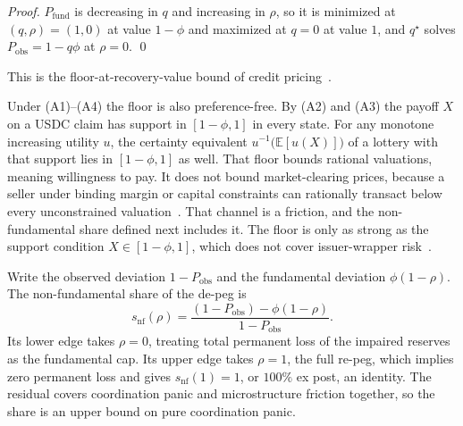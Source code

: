 \begin{proof}
$P_{\mathrm{fund}}$ is decreasing in $q$ and increasing in $\rho$, so it is minimized at
$(q,\rho)=(1,0)$ at value $1-\phi$ and maximized at $q=0$ at value $1$, and $q^{\star}$
solves $P_{\mathrm{obs}}=1-q\phi$ at $\rho=0$. \qed
\end{proof}

This is the floor-at-recovery-value bound of credit
pricing~\cite{merton1974,duffiesingleton1999}.

Under (A1)--(A4) the floor is also preference-free. By (A2) and (A3) the payoff $X$ on a
USDC claim has support in $[1-\phi,1]$ in every state. For any monotone increasing utility
$u$, the certainty equivalent $u^{-1}\!\bigl(\mathbb{E}[u(X)]\bigr)$ of a lottery with
that support lies in $[1-\phi,1]$ as well. That floor bounds rational
valuations, meaning willingness to pay. It does not bound market-clearing
prices, because a seller under binding margin or capital constraints can rationally
transact below every unconstrained valuation~\cite{shleifervishny1997,grombvayanos2010}.
That channel is a friction, and the non-fundamental share defined next includes it. The
floor is only as strong as the support condition $X\in[1-\phi,1]$, which does not cover
issuer-wrapper risk~\cite{Gorton_2021}.

Write the observed deviation $1-P_{\mathrm{obs}}$ and the fundamental deviation
$\phi(1-\rho)$. The non-fundamental share of the de-peg is
\begin{equation}
s_{\mathrm{nf}}(\rho)
  = \frac{(1-P_{\mathrm{obs}})-\phi(1-\rho)}{1-P_{\mathrm{obs}}} .
\label{eq:share}
\end{equation}
Its lower edge takes $\rho=0$, treating total permanent loss of the impaired reserves as
the fundamental cap. Its upper edge takes $\rho=1$, the full re-peg, which
implies zero permanent loss and gives $s_{\mathrm{nf}}(1)=1$, or $100\%$ ex post, an
identity. The residual covers coordination panic and microstructure friction together, so
the share is an upper bound on pure coordination panic.

